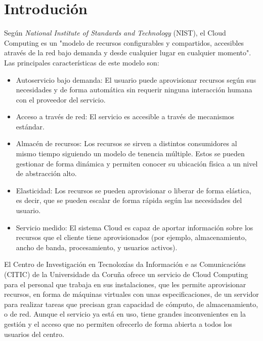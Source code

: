 \chapter{Introdución}
\label{chap:introducion}
Según \textit{National Institute of Standards and Technology} (NIST), el Cloud Computing es un "modelo de recursos configurables y compartidos, accesibles através de la red bajo demanda y desde cualquier lugar en cualquier momento"\cite{DefCloudComputing}. Las principales características de este modelo son:
\begin{itemize}
    \item Autoservicio bajo demanda: El usuario puede aprovisionar recursos según sus necesidades y de forma automática sin requerir ninguna interacción humana con el proveedor del servicio.
    \item Acceso a través de red: El servicio es accesible a través de mecanismos estándar.
    \item Almacén de recursos: Los recursos se sirven a distintos consumidores al mismo tiempo siguiendo un modelo de tenencia múltiple. Estos se pueden gestionar de forma dinámica y permiten conocer su ubicación física a un nivel de abstracción alto.
    \item Elasticidad: Los recursos se pueden aprovisionar o liberar de forma elástica, es decir, que se pueden escalar de forma rápida según las necesidades del usuario.
    \item Servicio medido: El sistema Cloud es capaz de aportar información sobre los recursos que el cliente tiene aprovisionados (por ejemplo, almacenamiento, ancho de banda, procesamiento, y usuarios activos).
\end{itemize}
 
 El Centro de Investigación en Tecnoloxías da Información e as Comunicacións (CITIC) de la Universidade da Coruña ofrece un servicio de Cloud Computing para el personal que trabaja en sus instalaciones, que les permite aprovisionar recursos, en forma de máquinas virtuales con unas especificaciones, de un servidor para realizar tareas que precisan gran capacidad de cómputo, de almacenamiento, o de red. Aunque el servicio ya está en uso, tiene grandes inconvenientes en la gestión y el acceso que no permiten ofrecerlo de forma abierta a todos los usuarios del centro.\\
 
